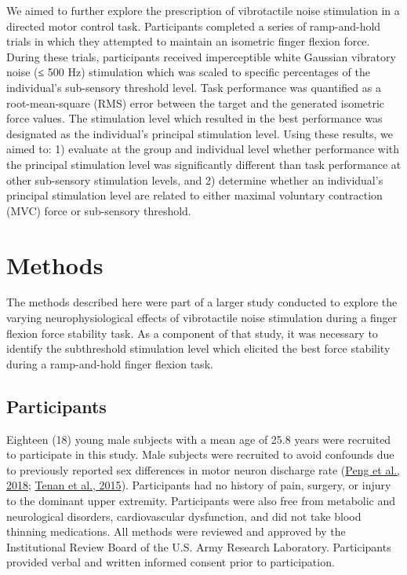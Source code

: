 \documentclass[]{cik}%
\begin{document}
We aimed to further explore the prescription of vibrotactile noise
stimulation in a directed motor control task. Participants completed a
series of ramp-and-hold trials in which they attempted to maintain an
isometric finger flexion force. During these trials, participants
received imperceptible white Gaussian vibratory noise (≤ 500 Hz)
stimulation which was scaled to specific percentages of the individual's
sub-sensory threshold level. Task performance was quantified as a
root-mean-square (RMS) error between the target and the generated
isometric force values. The stimulation level which resulted in the best
performance was designated as the individual's principal stimulation
level. Using these results, we aimed to: 1) evaluate at the group and
individual level whether performance with the principal stimulation
level was significantly different than task performance at other
sub-sensory stimulation levels, and 2) determine whether an individual's
principal stimulation level are related to either maximal voluntary
contraction (MVC) force or sub-sensory threshold.

\newpage

\hypertarget{methods}{%
\section{Methods}\label{methods}}

The methods described here were part of a larger study conducted to
explore the varying neurophysiological effects of vibrotactile noise
stimulation during a finger flexion force stability task. As a component
of that study, it was necessary to identify the subthreshold stimulation
level which elicited the best force stability during a ramp-and-hold
finger flexion task.

\hypertarget{participants}{%
\subsection{Participants}\label{participants}}

Eighteen (18) young male subjects with a mean age of 25.8 years
were recruited to participate in this study. Male subjects were
recruited to avoid confounds due to previously reported sex differences
in motor neuron discharge rate (\protect\hyperlink{ref-Peng2018}{Peng et
al., 2018}; \protect\hyperlink{ref-Tenan2016}{Tenan et al., 2015}).
Participants had no history of pain, surgery, or injury to the dominant
upper extremity. Participants were also free from metabolic and
neurological disorders, cardiovascular dysfunction, and did not take
blood thinning medications. All methods were reviewed and approved by
the Institutional Review Board of the U.S. Army Research Laboratory.
Participants provided verbal and written informed consent prior to
participation.
\end{document}
